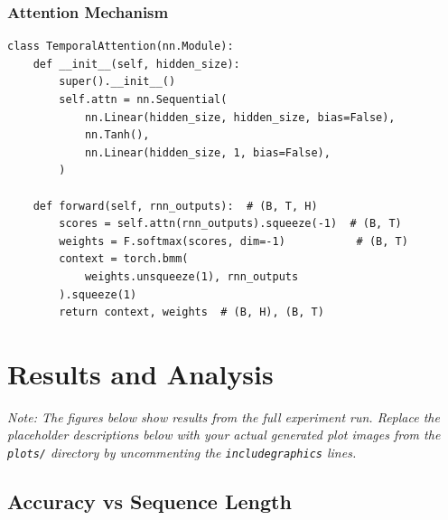 \documentclass[12pt, a4paper]{article}
\begin{document}
\subsubsection{Attention Mechanism}

\begin{lstlisting}[caption={Bahdanau-style temporal attention over LSTM hidden states.}, label={lst:attn}]
class TemporalAttention(nn.Module):
    def __init__(self, hidden_size):
        super().__init__()
        self.attn = nn.Sequential(
            nn.Linear(hidden_size, hidden_size, bias=False),
            nn.Tanh(),
            nn.Linear(hidden_size, 1, bias=False),
        )

    def forward(self, rnn_outputs):  # (B, T, H)
        scores = self.attn(rnn_outputs).squeeze(-1)  # (B, T)
        weights = F.softmax(scores, dim=-1)           # (B, T)
        context = torch.bmm(
            weights.unsqueeze(1), rnn_outputs
        ).squeeze(1)
        return context, weights  # (B, H), (B, T)
\end{lstlisting}


\section{Results and Analysis}

\textit{Note: The figures below show results from the full experiment run. Replace the placeholder descriptions below with your actual generated plot images from the \texttt{plots/} directory by uncommenting the \texttt{includegraphics} lines.}

\subsection{Accuracy vs Sequence Length}

\end{document}
